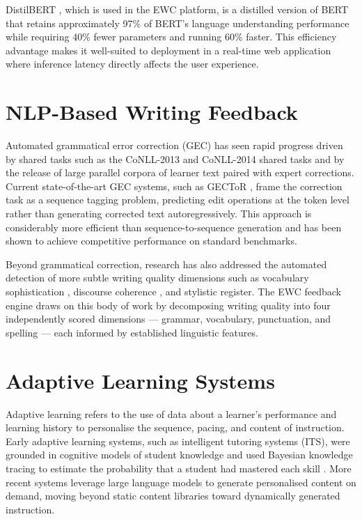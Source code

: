\documentclass[12pt, a4paper]{report}
\begin{document}
DistilBERT \cite{sanh2019}, which is used in the EWC platform, is a distilled version of BERT that retains approximately 97\% of BERT's language understanding performance while requiring 40\% fewer parameters and running 60\% faster. This efficiency advantage makes it well-suited to deployment in a real-time web application where inference latency directly affects the user experience.

\section{NLP-Based Writing Feedback}

Automated grammatical error correction (GEC) has seen rapid progress driven by shared tasks such as the CoNLL-2013 and CoNLL-2014 shared tasks \cite{ng2014} and by the release of large parallel corpora of learner text paired with expert corrections. Current state-of-the-art GEC systems, such as GECToR \cite{omelianchuk2020}, frame the correction task as a sequence tagging problem, predicting edit operations at the token level rather than generating corrected text autoregressively. This approach is considerably more efficient than sequence-to-sequence generation and has been shown to achieve competitive performance on standard benchmarks.

Beyond grammatical correction, research has also addressed the automated detection of more subtle writing quality dimensions such as vocabulary sophistication \cite{kyle2019}, discourse coherence \cite{pitler2008}, and stylistic register. The EWC feedback engine draws on this body of work by decomposing writing quality into four independently scored dimensions — grammar, vocabulary, punctuation, and spelling — each informed by established linguistic features.

\section{Adaptive Learning Systems}

Adaptive learning refers to the use of data about a learner's performance and learning history to personalise the sequence, pacing, and content of instruction. Early adaptive learning systems, such as intelligent tutoring systems (ITS), were grounded in cognitive models of student knowledge and used Bayesian knowledge tracing to estimate the probability that a student had mastered each skill \cite{corbett1994}. More recent systems leverage large language models to generate personalised content on demand, moving beyond static content libraries toward dynamically generated instruction.
\end{document}
